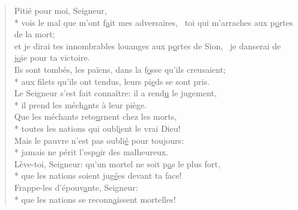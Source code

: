 \begin{verse}
Pitié pour moi, Seigneur, \\*
vois le mal que m’ont f\underline{a}it mes adversaires,~\psalmstar
toi qui m’arraches aux p\underline{o}rtes de la mort; \\
et je dirai tes innombrables louanges
aux p\underline{o}rtes de Sion,~\psalmstar
je danserai de j\underline{o}ie pour ta victoire. \\

Ils sont tombés, les païens, dans la f\underline{o}sse qu’ils creusaient; \\*
aux filets qu’ils ont tendus, leurs pi\underline{e}ds se sont pris. \\
Le Seigneur s’est fait connaître: il a rend\underline{u} le jugement, \\*
il prend les méch\underline{a}nts à leur piège. \\

Que les méchants reto\underline{u}rnent chez les morts, \\*
toutes les nations qui oubl\underline{i}ent le vrai Dieu! \\
Mais le pauvre n’est pas oubli\underline{é} pour toujours: \\*
jamais ne périt l’esp\underline{o}ir des malheureux. \\

Lève-toi, Seigneur: qu’un mortel ne soit p\underline{a}s le plus fort, \\*
que les nations soient jug\underline{é}es devant ta face! \\
Frappe-les d’épouv\underline{a}nte, Seigneur: \\*
que les nations se reconn\underline{a}issent mortelles! \\
\end{verse}


